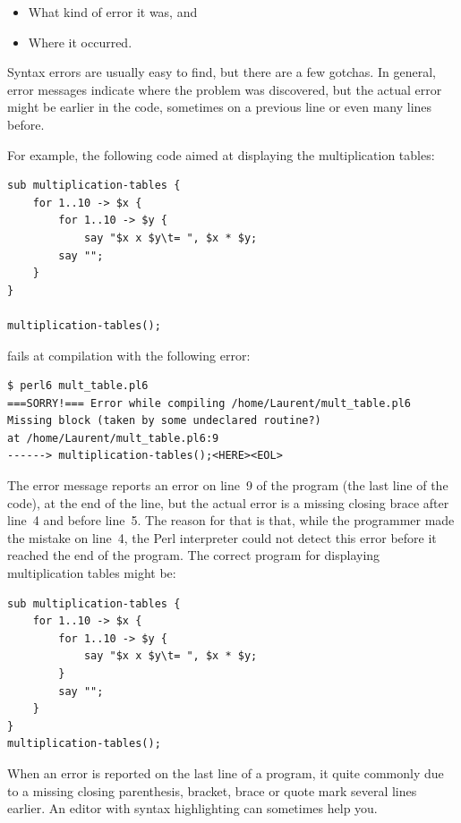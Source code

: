 \begin{itemize}

\item What kind of error it was, and

\item Where it occurred.

\end{itemize}

Syntax errors are usually easy to find, but there are a few
gotchas. In general, error messages indicate where the problem was discovered, but the actual error might be earlier in 
the code, sometimes on a previous line or even many lines 
before.

For example, the following code aimed at displaying the 
multiplication tables:

\begin{verbatim}
sub multiplication-tables {
    for 1..10 -> $x {
	    for 1..10 -> $y {
            say "$x x $y\t= ", $x * $y;
        say "";
	}
}

multiplication-tables();
\end{verbatim}

fails at compilation with the following error:

\begin{verbatim}
$ perl6 mult_table.pl6
===SORRY!=== Error while compiling /home/Laurent/mult_table.pl6
Missing block (taken by some undeclared routine?)
at /home/Laurent/mult_table.pl6:9
------> multiplication-tables();<HERE><EOL>
\end{verbatim}

The error message reports an error on line~9 of the program 
(the last line of the code), at the end of the line, but 
the actual error is a missing closing brace after line~4 
and before line~5. The reason for that is that, while the 
programmer made the mistake on line~4, the Perl interpreter 
could not detect this error before it reached the 
end of the program. The correct program for displaying 
multiplication 
tables might be:

\begin{verbatim}
sub multiplication-tables {
    for 1..10 -> $x {
        for 1..10 -> $y {
            say "$x x $y\t= ", $x * $y;
        }
        say "";
    }
}
multiplication-tables();
\end{verbatim}

When an error is reported on the last line of a program, 
it quite commonly due to a missing closing parenthesis, 
bracket, brace or quote mark several lines earlier. An editor with 
syntax highlighting can sometimes help you.

